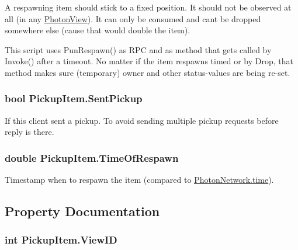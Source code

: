 A respawning item should stick to a fixed position. It should not be observed at all (in any \hyperlink{class_photon_view}{Photon\+View}). It can only be consumed and can\textquotesingle{}t be dropped somewhere else (cause that would double the item).

This script uses Pun\+Respawn() as R\+PC and as method that gets called by Invoke() after a timeout. No matter if the item respawns timed or by Drop, that method makes sure (temporary) owner and other status-\/values are being re-\/set. 
\subsubsection[{\texorpdfstring{Sent\+Pickup}{SentPickup}}]{\setlength{\rightskip}{0pt plus 5cm}bool Pickup\+Item.\+Sent\+Pickup}\hypertarget{class_pickup_item_a2cb53f4bb11cda01690309bf2de67894}{}\label{class_pickup_item_a2cb53f4bb11cda01690309bf2de67894}


If this client sent a pickup. To avoid sending multiple pickup requests before reply is there.

\subsubsection[{\texorpdfstring{Time\+Of\+Respawn}{TimeOfRespawn}}]{\setlength{\rightskip}{0pt plus 5cm}double Pickup\+Item.\+Time\+Of\+Respawn}\hypertarget{class_pickup_item_a73055debb47c9bcf0813e74a0fd6e3ee}{}\label{class_pickup_item_a73055debb47c9bcf0813e74a0fd6e3ee}


Timestamp when to respawn the item (compared to \hyperlink{class_photon_network_a86ab96957666ef72830a35662ef3d30b}{Photon\+Network.\+time}). 



\subsection{Property Documentation}
\subsubsection[{\texorpdfstring{View\+ID}{ViewID}}]{\setlength{\rightskip}{0pt plus 5cm}int Pickup\+Item.\+View\+ID\hspace{0.3cm}{\ttfamily [get]}}\hypertarget{class_pickup_item_a51ef87cc3a26bfe0006b66ac3a2fd056}{}\label{class_pickup_item_a51ef87cc3a26bfe0006b66ac3a2fd056}






